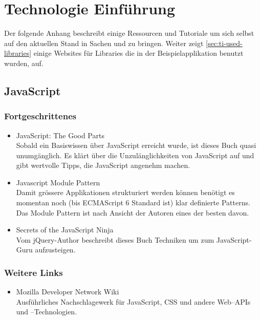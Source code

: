 \chapter{Technologie Einführung}

Der folgende Anhang beschreibt einige Ressourcen und Tutoriale um sich selbst
auf den aktuellen Stand in Sachen  und  zu bringen.
Weiter zeigt \ref{sec:ti-used-libraries} einige Websites für Libraries die in der
Beispielapplikation benutzt wurden, auf.

\section{JavaScript}
\label{sec:ti-javascript}

\subsection*{Fortgeschrittenes}
\begin{itemize}
	\item JavaScript: The Good Parts \cite{Crockford:2008:JGP:1386753} \\
		Sobald ein Basiswissen über JavaScript erreicht wurde, ist dieses Buch
		quasi unumgänglich. Es klärt über die Unzulänglichkeiten von JavaScript
		auf und gibt wertvolle Tipps, die JavaScript angenehm machen.
	\item Javascript Module Pattern \cite{JSModulePattern} \\
		Damit grössere Applikationen strukturiert werden können benötigt es
		momentan noch (bis ECMAScript 6 Standard ist) klar definierte Patterns.
		Das Module Pattern ist nach Ansicht der Autoren eines der besten davon.
	\item Secrets of the JavaScript Ninja \cite{resig2012secrets} \\
		Vom jQuery-Author beschreibt dieses Buch Techniken um zum
		JavaScript-Guru aufzusteigen.
\end{itemize}

\subsection*{Weitere Links}
\begin{itemize}
	\item Mozilla Developer Network Wiki \cite{MDN} \\
		Ausführliches Nachschlagewerk für JavaScript, CSS und
		andere Web--APIs und --Technologien.
\end{itemize}

